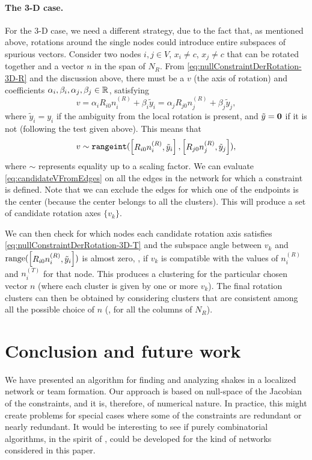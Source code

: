 \documentclass[12pt]{article}
\DeclareMathOperator{\rangespace}{range}
\newcommand{\rangeint}{\texttt{rangeint}}
\newcommand{\niT}{n_i^{(T)}}
\newcommand{\niR}{n_i^{(R)}}
\newcommand{\njR}{n_j^{(R)}}
\begin{document}
\paragraph{The 3-D case.} For the 3-D case, we need a different strategy, due to the fact that, as mentioned above, rotations around the single nodes could introduce entire subspaces of spurious vectors.
Consider two nodes $i,j\in V$, $x_i\neq c$, $x_j\neq c$ that can be rotated together and a vector $n$ in the span of $N_R$. From \eqref{eq:nullConstraintDerRotation-3D-R} and the discussion above, there must be a $v$ (the axis of rotation) and coefficients $\alpha_i,\beta_i,\alpha_j,\beta_j\in\mathbb{R}^{}{}$, satisfying
\begin{equation}
  v=\alpha_i R_{i0} \niR + \beta_i \tilde{y}_i=\alpha_j R_{j0} \njR + \beta_j \tilde{y}_j,
\end{equation}
where $\tilde{y}_i=y_i$ if the ambiguity from the local rotation is present, and $\tilde{y}=\boldsymbol{0}$ if it is not (following the test given above).
This means that
\begin{equation}
\label{eq:candidateVFromEdges}
  v\sim \rangeint(\bmat{R_{i0}\niR,\tilde{y}_i},\bmat{R_{j0}\njR,\tilde{y}_j}),
\end{equation}
where $\sim$ represents equality up to a scaling factor. We can evaluate \eqref{eq:candidateVFromEdges} on all the edges in the network for which a constraint is defined. Note that we can exclude the edges for which one of the endpoints is the center (because the center belongs to all the clusters). This will produce a set of candidate rotation axes $\{v_{k}\}$.


 We can then check for which nodes each candidate rotation axis satisfies \eqref{eq:nullConstraintDerRotation-3D-T} and the subspace angle between $v_k$ and $\rangespace(\bmat{R_{i0}\niR,\tilde{y}_i})$ is almost zero, \ie, if $v_k$ is compatible with the values of $\niR$ and $\niT$ for that node. This produces a clustering for the particular chosen vector $n$ (where each cluster is given by one or more $v_{k}$). The final rotation clusters can then be obtained by considering clusters that are consistent among all the possible choice of $n$ (\eg, for all the columns of $N_R$).



\section{Conclusion and future work}
We have presented an algorithm for finding and analyzing shakes in a localized network or team formation. Our approach is based on null-space of the Jacobian of the constraints, and it is, therefore, of numerical nature. In practice, this might create problems for special cases where some of the constraints are redundant or nearly redundant. It would be interesting to see if purely combinatorial algorithms, in the spirit of \cite{??}, could be developed for the kind of networks considered in this paper.
\end{document}
